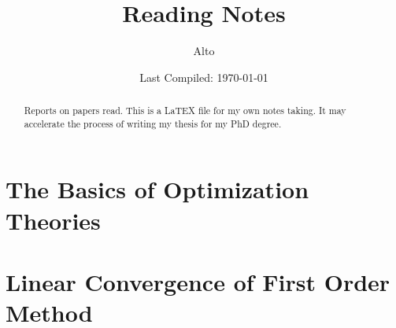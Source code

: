 \documentclass[12pt]{report}
\begin{document}
\title{{\selectfont Reading Notes}}

\author{
    Alto
}

\date{Last Compiled: \today}

\maketitle

\begin{abstract} 
    Reports on papers read. 
    This is a LaTEX file for my own notes taking. 
    It may accelerate the process of writing my thesis for my PhD degree. 
\end{abstract}
\chapter{The Basics of Optimization Theories}
\chapter{Linear Convergence of First Order Method}






\end{document}
